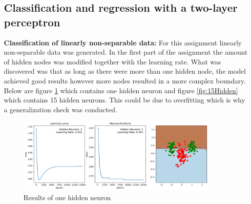 \documentclass[a4paper]{article}
\begin{document}
\subsection{Classification and regression with a two-layer perceptron}
\textbf{Classification of linearly non-separable data:} For this assignment linearly non-separable data was generated. In the first part of the assignment the amount of hidden nodes was modified together with the learning rate. What was discovered was that as long as there were more than one hidden node, the model achieved good results however more nodes resulted in a more complex boundary. Below are figure \ref{fig:1Hidden} which contains one hidden neuron and figure \ref{fig:15Hidden} which contains 15 hidden neurons. This could be due to overfitting which is why a generalization check was conducted.

\begin{figure}[htb]
    \centering
    \includegraphics[width=10cm]{Labs/Lab 1/Lab 1b/Figure/1Hiddenlayer.png}
    \caption{Results of one hidden neuron}
    \label{fig:1Hidden}
\end{figure}
\end{document}
